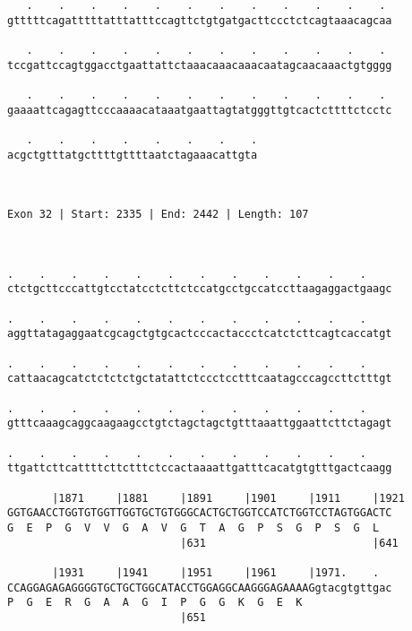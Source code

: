 \documentclass{article}
\begin{document}
\begin{Verbatim}
   .    .    .    .    .    .    .    .    .    .    .    . 
gtttttcagatttttatttatttccagttctgtgatgacttccctctcagtaaacagcaa
                                                            
   .    .    .    .    .    .    .    .    .    .    .    . 
tccgattccagtggacctgaattattctaaacaaacaaacaatagcaacaaactgtgggg
                                                            
   .    .    .    .    .    .    .    .    .    .    .    . 
gaaaattcagagttcccaaaacataaatgaattagtatgggttgtcactcttttctcctc
                                                            
   .    .    .    .    .    .    .    .
acgctgtttatgcttttgttttaatctagaaacattgta
                                       
                                       
 
Exon 32 | Start: 2335 | End: 2442 | Length: 107



.    .    .    .    .    .    .    .    .    .    .    .    
ctctgcttcccattgtcctatcctcttctccatgcctgccatccttaagaggactgaagc
                                                            
.    .    .    .    .    .    .    .    .    .    .    .    
aggttatagaggaatcgcagctgtgcactcccactaccctcatctcttcagtcaccatgt
                                                            
.    .    .    .    .    .    .    .    .    .    .    .    
cattaacagcatctctctctgctatattctccctcctttcaatagcccagccttctttgt
                                                            
.    .    .    .    .    .    .    .    .    .    .    .    
gtttcaaagcaggcaagaagcctgtctagctagctgtttaaattggaattcttctagagt
                                                            
.    .    .    .    .    .    .    .    .    .    .    .    
ttgattcttcattttcttctttctccactaaaattgatttcacatgtgtttgactcaagg
                                                            
       |1871     |1881     |1891     |1901     |1911     |1921
GGTGAACCTGGTGTGGTTGGTGCTGTGGGCACTGCTGGTCCATCTGGTCCTAGTGGACTC
G  E  P  G  V  V  G  A  V  G  T  A  G  P  S  G  P  S  G  L  
                           |631                          |641
  
       |1931     |1941     |1951     |1961     |1971.    .  
CCAGGAGAGAGGGGTGCTGCTGGCATACCTGGAGGCAAGGGAGAAAAGgtacgtgttgac
P  G  E  R  G  A  A  G  I  P  G  G  K  G  E  K              
                           |651                             
  

\end{Verbatim}
\end{document}
